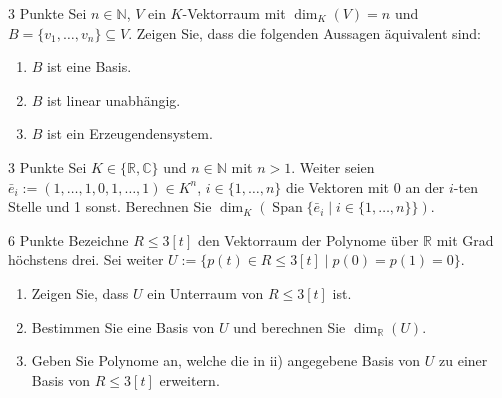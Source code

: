 \documentclass{problemset}
\author{Michael van Straten}
\begin{document}
\maketitle

\begin{problem}{3 Punkte}
Sei $n \in \mathbb{N}$, $V$ ein $K$-Vektorraum mit $\dim_K(V) = n$ und $B =
    \{v_1, \ldots, v_n\} \subseteq V$. Zeigen Sie, dass die folgenden Aussagen
äquivalent sind:
\begin{enumerate}
    \item $B$ ist eine Basis.
    \item $B$ ist linear unabhängig.
    \item $B$ ist ein Erzeugendensystem.
\end{enumerate}

\end{problem}

\begin{problem}{3 Punkte}
Sei $K \in \{ \mathbb{R}, \mathbb{C} \}$ und $n \in \mathbb{N}$ mit $n > 1$.
Weiter seien $\bar{e}_i := (1, \ldots, 1, 0, 1, \ldots, 1) \in K^n$, $i \in
    \{1, \ldots, n\}$ die Vektoren mit 0 an der $i$-ten Stelle und 1 sonst.
Berechnen Sie $\dim_K(\operatorname{Span}\{\bar{e}_i \mid i \in \{1, \ldots,
    n\}\})$.
\end{problem}

\begin{problem}{6 Punkte}
Bezeichne $R\leq 3[t]$ den Vektorraum der Polynome über $\mathbb{R}$ mit Grad
höchstens drei. Sei weiter $U := \{p(t) \in R\leq 3[t] \mid p(0) = p(1) = 0\}$.
\begin{enumerate}
    \item Zeigen Sie, dass $U$ ein Unterraum von $R\leq 3[t]$ ist.
    \item Bestimmen Sie eine Basis von $U$ und berechnen Sie
          $\dim_{\mathbb{R}}(U)$.
    \item Geben Sie Polynome an, welche die in ii) angegebene Basis von $U$ zu
          einer Basis von $R\leq 3[t]$ erweitern.
\end{enumerate}
\end{problem}
\end{document}
